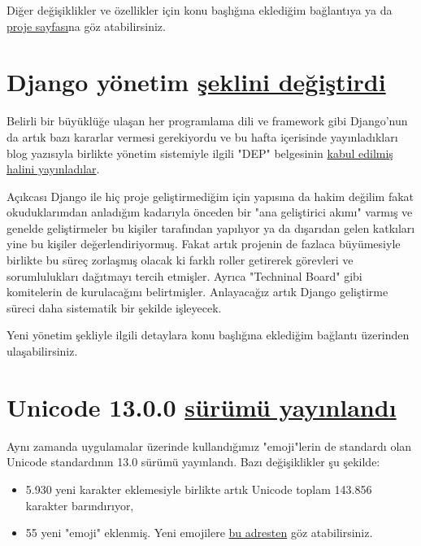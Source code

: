 \documentclass[11pt]{article}
\begin{document}
Diğer değişiklikler ve özellikler için konu başlığına eklediğim bağlantıya ya
da \href{https://github.com/twbs/bootstrap/projects/11}{proje sayfası}na göz atabilirsiniz.
\section{Django yönetim \href{https://www.djangoproject.com/weblog/2020/mar/12/governance/}{şeklini değiştirdi}}
\label{sec:org8e8f7ff}
Belirli bir büyüklüğe ulaşan her programlama dili ve framework gibi Django'nun
da artık bazı kararlar vermesi gerekiyordu ve bu hafta içerisinde
yayınladıkları blog yazısıyla birlikte yönetim sistemiyle ilgili "DEP"
belgesinin \href{https://github.com/django/deps/blob/master/accepted/0010-new-governance.rst}{kabul edilmiş halini yayınladılar}.

Açıkcası Django ile hiç proje geliştirmediğim için yapısına da hakim değilim
fakat okuduklarımdan anladığım kadarıyla önceden bir "ana geliştirici akımı"
varmış ve genelde geliştirmeler bu kişiler tarafından yapılıyor ya da
dışarıdan gelen katkıları yine bu kişiler değerlendiriyormuş. Fakat artık
projenin de fazlaca büyümesiyle birlikte bu süreç zorlaşmış olacak ki farklı
roller getirerek görevleri ve sorumlulukları dağıtmayı tercih etmişler. Ayrıca
"Techninal Board" gibi komitelerin de kurulacağını belirtmişler. Anlayacağız
artık Django geliştirme süreci daha sistematik bir şekilde işleyecek.

Yeni yönetim şekliyle ilgili detaylara konu başlığına eklediğim bağlantı
üzerinden ulaşabilirsiniz.
\section{Unicode 13.0.0 \href{https://unicode.org/versions/Unicode13.0.0/}{sürümü yayınlandı}}
\label{sec:orgfa47e49}
Aynı zamanda uygulamalar üzerinde kullandığımız "emoji"lerin de standardı olan
Unicode standardının 13.0 sürümü yayınlandı. Bazı değişiklikler şu şekilde:

\begin{itemize}
\item 5.930 yeni karakter eklemesiyle birlikte artık Unicode toplam 143.856
karakter barındırıyor,
\item 55 yeni "emoji" eklenmiş. Yeni emojilere \href{https://unicode.org/emoji/charts-13.0/emoji-released.html}{bu adresten} göz atabilirsiniz.
\end{itemize}
\end{document}
